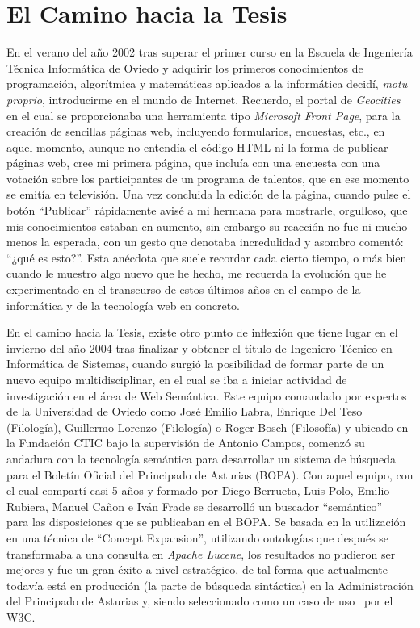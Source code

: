 \section{El Camino hacia la Tesis}
En el verano del año 2002 tras superar el primer curso en la Escuela de Ingeniería Técnica Informática de Oviedo
y adquirir los primeros conocimientos de programación, algorítmica y matemáticas aplicados a la informática
decidí, \textit{motu proprio}, introducirme en el mundo de Internet. Recuerdo, el portal de \textit{Geocities} en el 
cual se proporcionaba una herramienta tipo \textit{Microsoft Front Page}, para la creación de sencillas páginas
web, incluyendo formularios, encuestas, etc., en aquel momento, aunque no entendía el código \gls{HTML} ni la forma de publicar páginas
web, cree mi primera página, que incluía con una encuesta con una votación sobre los participantes de un programa
de talentos, que en ese momento se emitía en televisión. Una vez concluida la edición de la página, cuando pulse el botón ``Publicar'' 
rápidamente avisé a mi hermana para mostrarle, orgulloso, que mis conocimientos estaban en aumento, 
sin embargo su reacción no fue ni mucho menos la esperada, con un gesto que denotaba incredulidad y asombro comentó: ``¿qué es esto?''. 
Esta anécdota que suele recordar cada cierto tiempo, o más bien cuando le muestro algo nuevo que he hecho, me recuerda 
la evolución que he experimentado en el transcurso de estos últimos años en el campo de la informática y de la tecnología 
web en concreto.

En el camino hacia la Tesis, existe otro punto de inflexión que tiene lugar en el invierno del año 2004 tras finalizar y 
obtener el título de Ingeniero Técnico en Informática de Sistemas, cuando surgió la posibilidad
de formar parte de un nuevo equipo multidisciplinar, en el cual se iba a iniciar actividad de investigación en el área
de Web Semántica. Este equipo comandado por expertos de la Universidad de Oviedo como José Emilio Labra, Enrique Del Teso (Filología),
 Guillermo Lorenzo (Filología) o Roger Bosch (Filosofía) y ubicado en la Fundación CTIC bajo la 
supervisión de Antonio Campos, comenzó su andadura con la tecnología semántica para desarrollar un sistema de búsqueda para
el Boletín Oficial del Principado de Asturias (\gls{BOPA}). Con aquel equipo, con el cual compartí casi 5 años y formado
por Diego Berrueta, Luis Polo, Emilio Rubiera, Manuel Cañon e Iván Frade se desarrolló un buscador ``semántico''~\cite{bopaEstonia} para
las disposiciones que se publicaban en el BOPA. Se basada en la utilización en una técnica de ``Concept Expansion'', utilizando
ontologías que después se transformaba a una consulta en \textit{Apache Lucene}, los resultados no pudieron ser mejores y fue un gran éxito a nivel
estratégico, de tal forma que actualmente todavía está en producción (la parte de búsqueda sintáctica) en la Administración del Principado de 
Asturias y, siendo seleccionado como un caso de uso~\cite{bopa-use-case} por el \gls{W3C}. 

